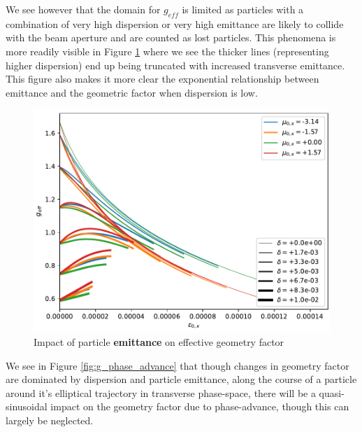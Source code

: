 We see however that the domain for $g_{eff}$ is limited as particles with a combination of very high dispersion or very high emittance are likely to collide with the beam aperture and are counted as lost particles. This phenomena is more readily visible in Figure \ref{fig:g_emittance} where we see the thicker lines (representing higher dispersion) end up being truncated with increased transverse emittance. This figure also makes it more clear the exponential relationship between emittance and the geometric factor when dispersion is low.

\begin{figure}
    \centering
    \includegraphics{figs/g_emittance.pdf}
    \caption{Impact of particle \textbf{emittance} on effective geometry factor}
    \label{fig:g_emittance}
\end{figure}

We see in Figure \ref{fig:g_phase_advance} that though changes in geometry factor are dominated by dispersion and particle emittance, along the course of a particle around it's elliptical trajectory in transverse phase-space, there will be a quasi-sinusoidal impact on the geometry factor due to phase-advance, though this can largely be neglected.

